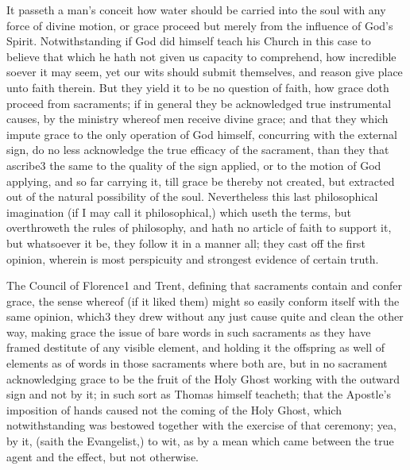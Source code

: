 It passeth a man’s conceit how water should be carried into the soul with any force of divine motion, or grace proceed but merely from the influence of God’s Spirit. Notwithstanding if God did himself teach his Church in this case to believe that which he hath not given us capacity to comprehend, how incredible soever it may seem, yet our wits should submit themselves, and reason give place unto faith therein. But they yield it to be no question of faith, how grace doth proceed from sacraments; if in general they be acknowledged true instrumental causes, by the ministry whereof men receive divine grace; and that they which impute grace to the only operation of God himself, concurring with the external sign, do no less acknowledge the true efficacy of the sacrament, than they that ascribe3 the same to the quality of the sign  applied, or to the motion of God applying, and so far carrying it, till grace be thereby not created, but extracted out of the natural possibility of the soul. Nevertheless this last philosophical imagination (if I may call it philosophical,) which useth the terms, but overthroweth the rules of philosophy, and hath no article of faith to support it, but whatsoever it be, they follow it in a manner all; they cast off the first opinion, wherein is most perspicuity and strongest evidence of certain truth.

The Council of Florence1 and Trent, defining that sacraments contain and confer grace, the sense whereof (if it liked them) might so easily conform itself with the same opinion, which3 they drew without any just cause quite and clean the other way, making grace the issue of bare words in such sacraments as they have framed destitute of any visible element, and holding it the offspring as well of elements as of words in those sacraments where both are, but in no sacrament acknowledging grace to be the fruit of the Holy Ghost working with the outward sign and not by it; in such sort as Thomas himself teacheth; that the Apostle’s imposition of hands caused not the coming of the Holy Ghost, which notwithstanding was bestowed together with the exercise of that ceremony; yea, by it, (saith the Evangelist,) to wit, as by a mean which came between the true agent and the effect, but not otherwise.

